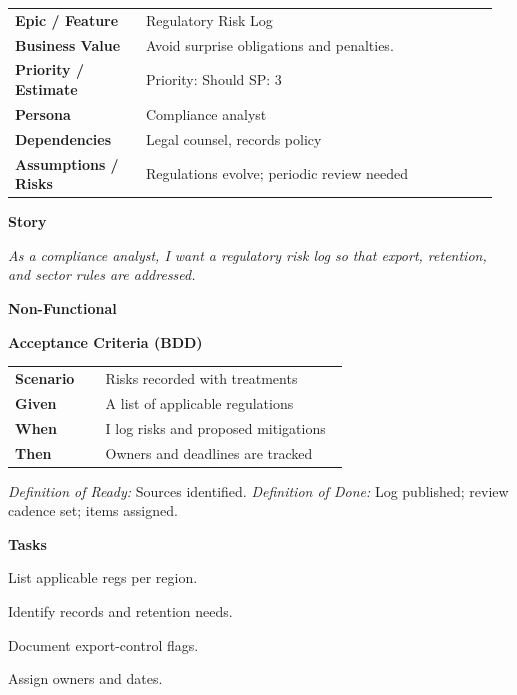 \documentclass[11pt,letterpaper]{article}
\makeatletter
\newenvironment{kvtable}{%
  \par\noindent\begin{tabular}{@{}>{\raggedright\bfseries\arraybackslash}p{0.26\linewidth} >{\raggedright\arraybackslash}p{0.70\linewidth}@{}}
}{\end{tabular}\par}
\newenvironment{bdd}{%
  \par\noindent\begin{tabular}{@{}>{\raggedright\bfseries\arraybackslash}p{0.26\linewidth} >{\raggedright\arraybackslash}p{0.70\linewidth}@{}}
}{\end{tabular}\par}
\newcommand{\DoRDoD}[2]{%
  \vspace{0.35em}
  {\footnotesize\color{Muted}%
    \textit{Definition of Ready:} #1 \; \textbullet\;
    \textit{Definition of Done:} #2%
  }%
}
\newenvironment{storycard}[2]{%
  \begin{tcolorbox}[cloudcard, title={#1 --- #2}]%
}{\end{tcolorbox}}
\newcommand{\sectionlabel}[1]{\par\vspace{0.35em}\textbf{#1}\par}
\makeatother
\begin{document}
\begin{storycard}{CCS-28}{Ch. 28 — Government Regulations \& Compliance Risks}
\begin{kvtable}
Epic / Feature & Regulatory Risk Log\\
Business Value & Avoid surprise obligations and penalties.\\
Priority / Estimate & Priority: Should \quad SP: 3\\
Persona & Compliance analyst\\
Dependencies & Legal counsel, records policy\\
Assumptions / Risks & Regulations evolve; periodic review needed\\
\end{kvtable}
\sectionlabel{Story}
\textit{As a compliance analyst, I want a regulatory risk log so that export, retention, and sector rules are addressed.}
\sectionlabel{Non-Functional}\;
\sectionlabel{Acceptance Criteria (BDD)}
\begin{bdd}
Scenario & Risks recorded with treatments\\
Given & A list of applicable regulations\\
When & I log risks and proposed mitigations\\
Then & Owners and deadlines are tracked\\
\end{bdd}
\DoRDoD{Sources identified.}{Log published; review cadence set; items assigned.}
\sectionlabel{Tasks}
\begin{checklist}
\item List applicable regs per region.
\item Identify records and retention needs.
\item Document export-control flags.
\item Assign owners and dates.
\end{checklist}
\end{storycard}
\end{document}
